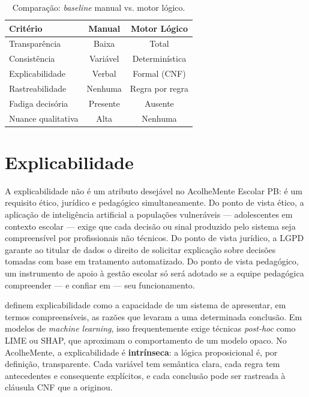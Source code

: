 \documentclass[
    12pt,
    openright,
    oneside,
    a4paper,
    english,
    brazil
]{abntex2}
\begin{document}


\begin{table}[H]
\centering
\caption{Comparação: \textit{baseline} manual vs. motor lógico.}
\label{tab:baseline}
\begin{tabular}{lcc}
\toprule
\textbf{Critério} & \textbf{Manual} & \textbf{Motor Lógico} \\
\midrule
Transparência     & Baixa      & Total \\
Consistência      & Variável   & Determinística \\
Explicabilidade   & Verbal     & Formal (CNF) \\
Rastreabilidade   & Nenhuma    & Regra por regra \\
Fadiga decisória  & Presente   & Ausente \\
Nuance qualitativa & Alta      & Nenhuma \\
\bottomrule
\end{tabular}
\end{table}

\chapter{Explicabilidade}

A explicabilidade não é um atributo desejável no AcolheMente Escolar PB: é um requisito ético, jurídico e pedagógico simultaneamente. Do ponto de vista ético, a aplicação de inteligência artificial a populações vulneráveis --- adolescentes em contexto escolar --- exige que cada decisão ou sinal produzido pelo sistema seja compreensível por profissionais não técnicos. Do ponto de vista jurídico, a LGPD \cite{brasil_lgpd_2018} garante ao titular de dados o direito de solicitar explicação sobre decisões tomadas com base em tratamento automatizado. Do ponto de vista pedagógico, um instrumento de apoio à gestão escolar só será adotado se a equipe pedagógica compreender --- e confiar em --- seu funcionamento.

 definem explicabilidade como a capacidade de um sistema de apresentar, em termos compreensíveis, as razões que levaram a uma determinada conclusão. Em modelos de \textit{machine learning}, isso frequentemente exige técnicas \textit{post-hoc} como LIME ou SHAP, que aproximam o comportamento de um modelo opaco. No AcolheMente, a explicabilidade é \textbf{intrínseca}: a lógica proposicional é, por definição, transparente. Cada variável tem semântica clara, cada regra tem antecedentes e consequente explícitos, e cada conclusão pode ser rastreada à cláusula CNF que a originou.
\end{document}
